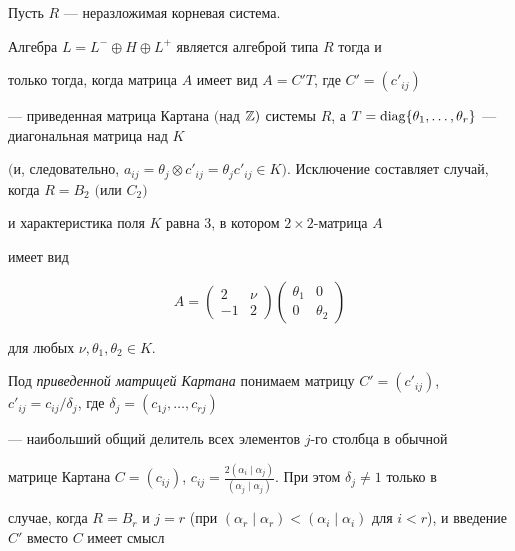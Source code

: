 \begin{thm}


Пусть $R$ --- неразложимая корневая система.


Алгебра $L=L^-\oplus H\oplus L^+$ является алгеброй типа $R$ тогда и


только тогда, когда матрица $A$ имеет вид $A=C'T$, где $C'=(c'_{ij})$


--- приведенная матрица Картана $($над $\Bbb Z)$ системы $R$, а $T=


\diag\{\theta_1,\dotsc,\theta_r\}$ --- диагональная матрица над $K$


$($и, следовательно, $a_{ij}=\theta_j\otimes c'_{ij}=\theta_jc'_{ij}\in


K)$. Исключение составляет случай, когда $R=B_2$ $($или $C_2)$


и характеристика поля $K$ равна $3$, в котором $2\times 2$-матрица $A$


имеет вид


\begin{equation}


A=


\begin{pmatrix} 2 & \nu \\ -1 & 2 \end{pmatrix}


\begin{pmatrix} \theta_1 & 0 \\ 0 & \theta_2 \end{pmatrix}


\end{equation}


для любых $\nu,\theta_1,\theta_2\in K$.


\end{thm}





Под {\it приведенной матрицей Картана} понимаем матрицу $C'=


(c'_{ij})$, $c'_{ij}=c_{ij}/\delta_j$, где $\delta_j=(c_{1j},\dotsc,c_{rj})$


--- наибольший общий делитель всех элементов $j$-го столбца в обычной


матрице Картана $C=(c_{ij})$, $c_{ij}=\frac{2(\alpha_i\mid\alpha_j)}


{(\alpha_j\mid\alpha_j)}$. При этом $\delta_j\ne 1$ только в


случае, когда $R=B_r$ и $j=r$ (при $(\alpha_r\mid\alpha_r)<


(\alpha_i\mid\alpha_i)$ для $i<r$), и введение $C'$ вместо $C$ имеет смысл


